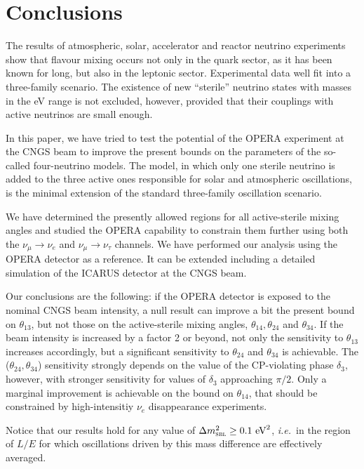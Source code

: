 \documentclass[12pt]{elsart}
\newcommand{\eVq}{\ensuremath{\text{eV}^2}}
\newcommand{\Dmq}{\Delta m^2}
\newcommand{\Sbl}{\textsc{sbl}}
\begin{document}
\section{Conclusions}
\label{sec:concl}

The results of atmospheric, solar, accelerator and reactor neutrino
experiments show that flavour mixing occurs not only in the quark
sector, as it has been known for long, but also in the leptonic
sector. Experimental data well fit into a three-family scenario. The
existence of new ``sterile'' neutrino states with masses in the eV
range is not excluded, however, provided that their couplings with
active neutrinos are small enough. 

In this paper, we have tried to test the potential of the OPERA
experiment at the CNGS beam to improve the present bounds on the
parameters of the so-called four-neutrino models.  The model, in which
only one sterile neutrino is added to the three active ones
responsible for solar and atmospheric oscillations, is the minimal
extension of the standard three-family oscillation scenario.

We have determined the presently allowed regions for all
active-sterile mixing angles and studied the OPERA capability to
constrain them further using both the $\nu_\mu \to \nu_e$ and $\nu_\mu
\to \nu_\tau$ channels. We have performed our analysis using the OPERA
detector as a reference.  It can be extended including a detailed
simulation of the ICARUS detector at the CNGS beam.

Our conclusions are the following: if the OPERA detector is exposed to
the nominal CNGS beam intensity, a null result can improve a bit the
present bound on $\theta_{13}$, but not those on the active-sterile
mixing angles, $\theta_{14},\theta_{24}$ and $\theta_{34}$. If the
beam intensity is increased by a factor 2 or beyond, not only the
sensitivity to $\theta_{13}$ increases accordingly, but a significant
sensitivity to $\theta_{24}$ and $\theta_{34}$ is achievable. The
($\theta_{24},\theta_{34}$) sensitivity strongly depends on the value
of the CP-violating phase $\delta_3$, however, with stronger
sensitivity for values of $\delta_3$ approaching $\pi/2$. Only a
marginal improvement is achievable on the bound on $\theta_{14}$, that
should be constrained by high-intensitiy $\nu_e$ disappearance 
experiments. 

Notice that our results hold for any value of $\Dmq_\Sbl \geq
0.1~\eVq$, \textit{i.e.}\ in the region of $L/E$ for which
oscillations driven by this mass difference are effectively averaged.
\end{document}
